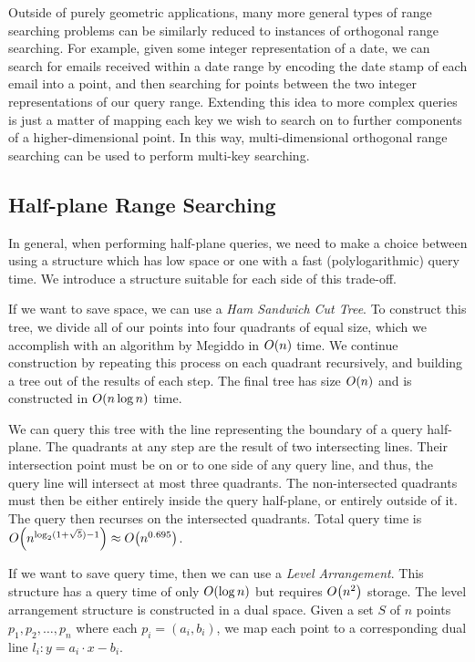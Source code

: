 Outside of purely geometric applications, many more general types of range searching problems can be similarly reduced to instances of orthogonal range searching.
For example, given some integer representation of a date, we can search for emails received within a date range by encoding the date stamp of each email into a point, and then searching for points between the two integer representations of our query range.
Extending this idea to more complex queries is just a matter of mapping each key we wish to search on to further components of a higher-dimensional point.  
In this way, multi-dimensional orthogonal range searching can be used to perform multi-key searching.\cite{Willard96} 


\subsection*{Half-plane Range Searching}

In general, when performing half-plane queries, we need to make a choice between using a structure which has low space or one with a fast (polylogarithmic) query time.
We introduce a structure suitable for each side of this trade-off.

If we want to save space, we can use a \emph{Ham Sandwich Cut Tree}\cite{Edelsbrunner86, Edelsbrunner87}.
To construct this tree, we divide all of our points into four quadrants of equal size, which we accomplish with an algorithm by Megiddo\cite{Megiddo85} in $O\!\left(n\right)$ time.
We continue construction by repeating this process on each quadrant recursively, and building a tree out of the results of each step.
The final tree has size $O\!\left(n\right)$ and is constructed in $O\!\left(n\log{n}\right)$ time.

We can query this tree with the line representing the boundary of a query half-plane.
The quadrants at any step are the result of two intersecting lines. 
Their intersection point must be on or to one side of any query line, and thus, the query line will intersect at most three quadrants.
The non-intersected quadrants must then be either entirely inside the query half-plane, or entirely outside of it.
The query then recurses on the intersected quadrants.
Total query time is $O\!\left(n^{\log_2(1 + \sqrt{5}) - 1}\right) \approx O\!\left(n^{0.695}\right)$.


If we want to save query time, then we can use a \emph{Level Arrangement}\cite{GoswamiDN04}.  
This structure has a query time of only $O\!\left(\log{n}\right)$ but requires $O\!\left(n^2\right)$ storage.
The level arrangement structure is constructed in a dual space.
Given a set $S$ of $n$ points $p_1, p_2, \ldots, p_n$ where each $p_i = (a_i, b_i)$, we map each point to a corresponding dual line $l_i: y = a_i \cdot x - b_i$.

